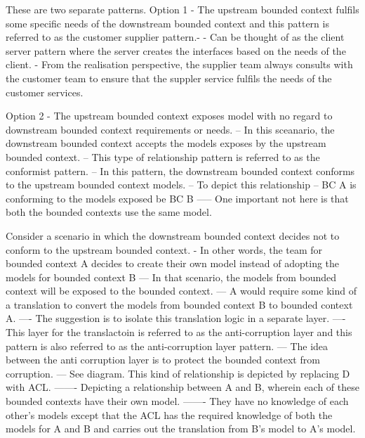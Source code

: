 \documentclass[a4paper, 11pt]{book}
\begin{document}
    These are two separate patterns.
    Option 1 - The upstream bounded context fulfils some specific needs of the downstream bounded context and this pattern is referred to as the customer supplier pattern.-
    - Can be thought of as the client server pattern where the server creates the interfaces based on the needs of the client.
    - From the realisation perspective, the supplier team always consults with the customer team to ensure that the suppler service fulfils the needs of the customer services.

    Option 2 - The upstream bounded context exposes model with no regard to downstream bounded context requirements or needs.
    -- In this sceanario, the downstream bounded context accepts the models exposes by the upstream bounded context.
    -- This type of relationship pattern is referred to as the conformist pattern.
    -- In this pattern, the downstream bounded context conforms to the upstream bounded context models.
    -- To depict this relationship %
    -- BC A is conforming to the models exposed be BC B
    ----- One important not here is that both the bounded contexts use the same model.


    Consider a scenario in which the downstream bounded context decides not to conform to the upstream bounded context.
    - In other words, the team for bounded context A decides to create their own model instead of adopting the models for bounded context B
    --- In that scenario, the models from bounded context will be exposed to the bounded context.
    --- A would require some kind of a translation to convert the models from bounded context B to bounded context A.
    ---- The suggestion is to isolate this translation logic in a separate layer.
    ---- This layer for the translactoin is referred to as the anti-corruption layer and this pattern is also referred to as the anti-corruption layer pattern.
    --- The idea between the anti corruption layer is to protect the bounded context from corruption.
    --- See diagram. This kind of relationship is depicted by replacing D with ACL.
    ------- Depicting a relationship between A and B, wherein each of these bounded contexts have their own model.
    ------- They have no knowledge of each other's models except that the ACL has the required knowledge of both the models for A and B and carries out the translation from B's model to A's model.
\end{document}
